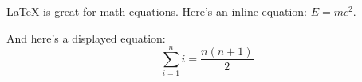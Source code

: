 LaTeX is great for math equations. Here's an inline equation: $E = mc^2$.

And here's a displayed equation:
\[
\sum_{i=1}^n i = \frac{n(n+1)}{2}
\]